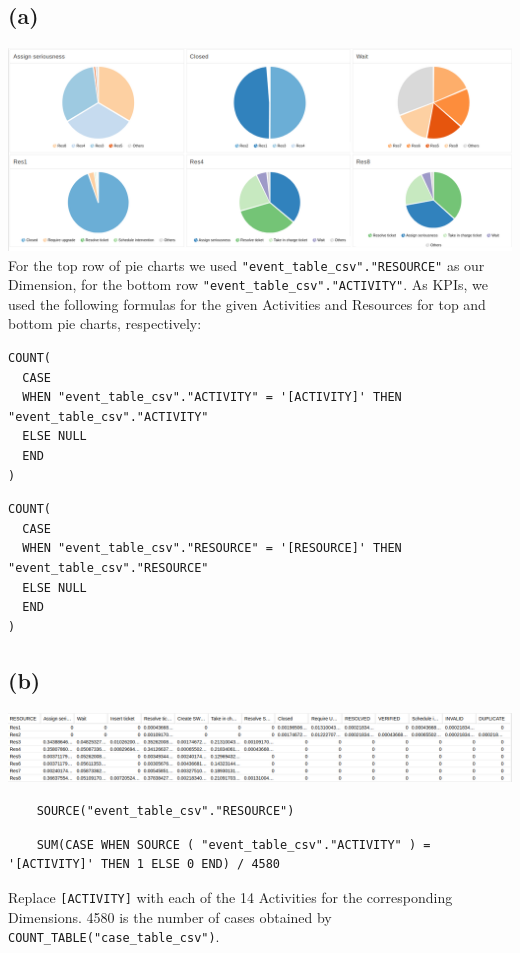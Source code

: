 \documentclass[../../main.tex]{subfiles}
\begin{document}
\subsection*{(a)}
\includegraphics[width=\columnwidth]{img/Celonis_a_Visualization.png}\\
For the top row of pie charts we used \verb|"event_table_csv"."RESOURCE"| as our Dimension, for the bottom row \verb|"event_table_csv"."ACTIVITY"|. As KPIs, we used the following formulas for the given Activities and Resources for top and bottom pie charts, respectively:
\begin{lstlisting}
COUNT(
  CASE
  WHEN "event_table_csv"."ACTIVITY" = '[ACTIVITY]' THEN "event_table_csv"."ACTIVITY"
  ELSE NULL
  END
)
\end{lstlisting}
\begin{lstlisting}
COUNT(
  CASE
  WHEN "event_table_csv"."RESOURCE" = '[RESOURCE]' THEN "event_table_csv"."RESOURCE"
  ELSE NULL
  END
)
\end{lstlisting}


\subsection*{(b)}
\includegraphics[width=\columnwidth]{img/Celonis_b_OLAP.png}\\
\begin{verbatim}
	SOURCE("event_table_csv"."RESOURCE")
\end{verbatim}
\begin{lstlisting}
	SUM(CASE WHEN SOURCE ( "event_table_csv"."ACTIVITY" ) = '[ACTIVITY]' THEN 1 ELSE 0 END) / 4580
\end{lstlisting}
Replace \verb|[ACTIVITY]| with each of the 14 Activities for the corresponding Dimensions. 4580 is the number of cases obtained by \verb|COUNT_TABLE("case_table_csv")|.
\end{document}
